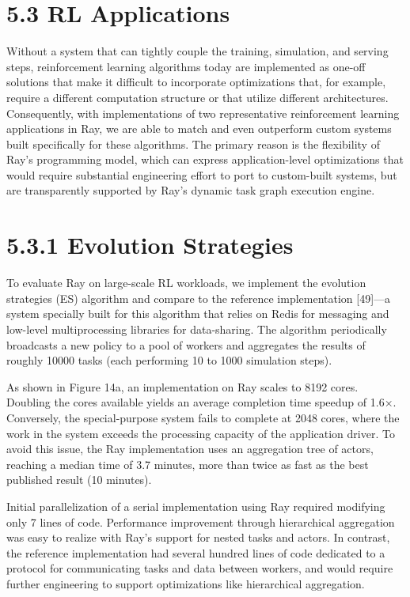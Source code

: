 \documentclass[
]{article}
\begin{document}
\section{5.3 RL Applications}\label{rl-applications}

Without a system that can tightly couple the training, simulation, and
serving steps, reinforcement learning algorithms today are implemented
as one-off solutions that make it difficult to incorporate optimizations
that, for example, require a different computation structure or that
utilize different architectures. Consequently, with implementations of
two representative reinforcement learning applications in Ray, we are
able to match and even outperform custom systems built specifically for
these algorithms. The primary reason is the flexibility of Ray's
programming model, which can express application-level optimizations
that would require substantial engineering effort to port to
custom-built systems, but are transparently supported by Ray's dynamic
task graph execution engine.

\section{5.3.1 Evolution Strategies}\label{evolution-strategies}

To evaluate Ray on large-scale RL workloads, we implement the evolution
strategies (ES) algorithm and compare to the reference implementation
{[}49{]}---a system specially built for this algorithm that relies on
Redis for messaging and low-level multiprocessing libraries for
data-sharing. The algorithm periodically broadcasts a new policy to a
pool of workers and aggregates the results of roughly 10000 tasks (each
performing 10 to 1000 simulation steps).

As shown in Figure 14a, an implementation on Ray scales to 8192 cores.
Doubling the cores available yields an average completion time speedup
of 1.6×. Conversely, the special-purpose system fails to complete at
2048 cores, where the work in the system exceeds the processing capacity
of the application driver. To avoid this issue, the Ray implementation
uses an aggregation tree of actors, reaching a median time of 3.7
minutes, more than twice as fast as the best published result (10
minutes).

Initial parallelization of a serial implementation using Ray required
modifying only 7 lines of code. Performance improvement through
hierarchical aggregation was easy to realize with Ray's support for
nested tasks and actors. In contrast, the reference implementation had
several hundred lines of code dedicated to a protocol for communicating
tasks and data between workers, and would require further engineering to
support optimizations like hierarchical aggregation.
\end{document}
